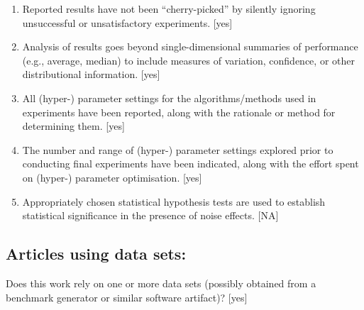 \documentclass[review]{jair}
\begin{document}
\begin{enumerate}
    [yes]
    \item 
    Reported results have not been ``cherry-picked'' by silently ignoring unsuccessful or unsatisfactory experiments. 
    [yes]
    \item 
    Analysis of results goes beyond single-dimensional summaries of performance (e.g., average, median) to include measures of variation, confidence, or other distributional information. 
    [yes]
    \item 
    All (hyper-) parameter settings for 
    the algorithms/methods used in experiments have been reported, along with the rationale or method for determining them. 
    [yes]
    \item 
    The number and range of (hyper-) parameter settings explored prior to conducting final experiments have been indicated, along with the effort spent on (hyper-) parameter optimisation. 
    [yes]
    \item 
    Appropriately chosen statistical hypothesis tests are used to establish statistical significance
    in the presence of noise effects.
    [NA]
\end{enumerate}


\subsection*{Articles using data sets:}
Does this work rely on one or more data sets (possibly obtained from a benchmark generator or similar software artifact)? 
[yes]
\end{document}
